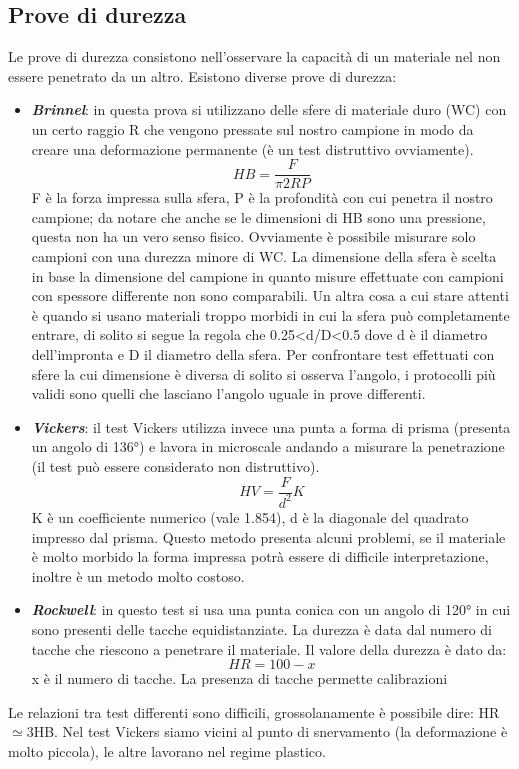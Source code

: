 \subsection{Prove di durezza}
Le prove di durezza consistono nell'osservare la capacità di un materiale nel non essere penetrato da un altro. Esistono diverse prove di durezza:
\begin{itemize}
    \item \textbf{\textit{Brinnel}}: in questa prova si utilizzano delle sfere di materiale duro (WC) con un certo raggio R che vengono pressate sul nostro campione in modo da creare una deformazione permanente (è un test distruttivo ovviamente).
    \begin{equation}
        HB=\frac{F}{\pi 2R P}
    \end{equation}
    F è la forza impressa sulla sfera, P è la profondità con cui penetra il nostro campione; da notare che anche se le dimensioni di HB sono una pressione, questa non ha un vero senso fisico.
    Ovviamente è possibile misurare solo campioni con una durezza minore di WC. La dimensione della sfera è scelta in base la dimensione del campione in quanto misure effettuate con campioni con spessore differente non sono comparabili. Un altra cosa a cui stare attenti è quando si usano materiali troppo morbidi in cui la sfera può completamente entrare, di solito si segue la regola che 0.25<d/D<0.5 dove d è il diametro dell'impronta e D il diametro della sfera. Per confrontare test effettuati con sfere la cui dimensione è diversa di solito si osserva l'angolo, i protocolli più validi sono quelli che lasciano l'angolo uguale in prove differenti.
    
    \item \textbf{\textit{Vickers}}: il test Vickers utilizza invece una punta a forma di prisma (presenta un angolo di 136°) e lavora in microscale andando a misurare la penetrazione (il test può essere considerato non distruttivo).
    \begin{equation}
        HV=\frac{F}{d^2}K
    \end{equation}
    K è un coefficiente numerico (vale 1.854), d è la diagonale del quadrato impresso dal prisma. Questo metodo presenta alcuni problemi, se il materiale è molto morbido la forma impressa potrà essere di difficile interpretazione, inoltre è un metodo molto costoso.
    \item \textbf{\textit{Rockwell}}: in questo test si usa una punta conica con un angolo di 120° in cui sono presenti delle tacche equidistanziate. La durezza è data dal numero di tacche che riescono a penetrare il materiale. Il valore della durezza è dato da:
    \begin{equation}
        HR=100-x
    \end{equation}
    x è il numero di tacche. La presenza di tacche permette calibrazioni
    \end{itemize}
Le relazioni tra test differenti sono difficili, grossolanamente è possibile dire: HR$\simeq$3HB. Nel test Vickers siamo vicini al punto di snervamento (la deformazione è molto piccola), le altre lavorano nel regime plastico.

